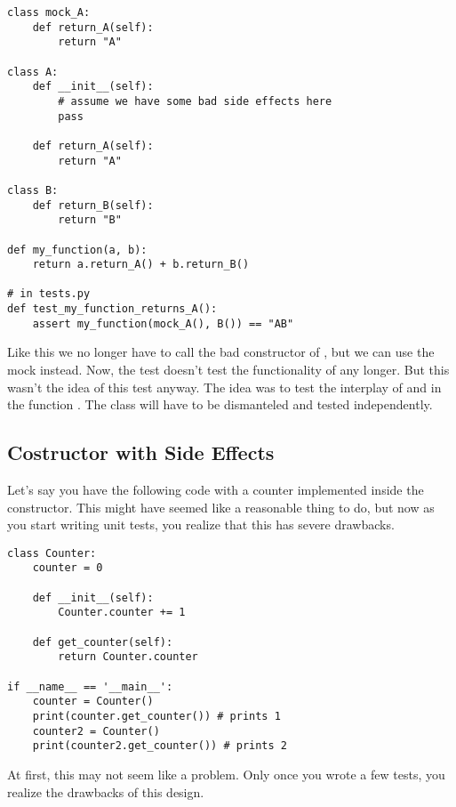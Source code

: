 \begin{programcode}{}
\begin{verbatim}
class mock_A:
    def return_A(self):
        return "A"

class A:
    def __init__(self):
        # assume we have some bad side effects here
        pass

    def return_A(self):
        return "A"
   
class B:
    def return_B(self):
        return "B"

def my_function(a, b):
    return a.return_A() + b.return_B()

# in tests.py
def test_my_function_returns_A():
    assert my_function(mock_A(), B()) == "AB"
\end{verbatim}
\end{programcode}

Like this we no longer have to call the bad constructor of , but we can use the mock instead. Now, the test doesn't test the functionality of  any longer. But this wasn't the idea of this test anyway. The idea was to test the interplay of  and  in the function . The class  will have to be dismanteled and tested independently.


\subsection{Costructor with Side Effects}

Let's say you have the following code with a counter implemented inside the constructor. This might have seemed like a reasonable thing to do, but now as you start writing unit tests, you realize that this has severe drawbacks.

\begin{programcode}{}
\begin{verbatim}
class Counter:
    counter = 0

    def __init__(self):
        Counter.counter += 1

    def get_counter(self):
        return Counter.counter

if __name__ == '__main__':
    counter = Counter()
    print(counter.get_counter()) # prints 1
    counter2 = Counter()
    print(counter2.get_counter()) # prints 2
\end{verbatim}
\end{programcode}

At first, this may not seem like a problem. Only once you wrote a few tests, you realize the drawbacks of this design.

